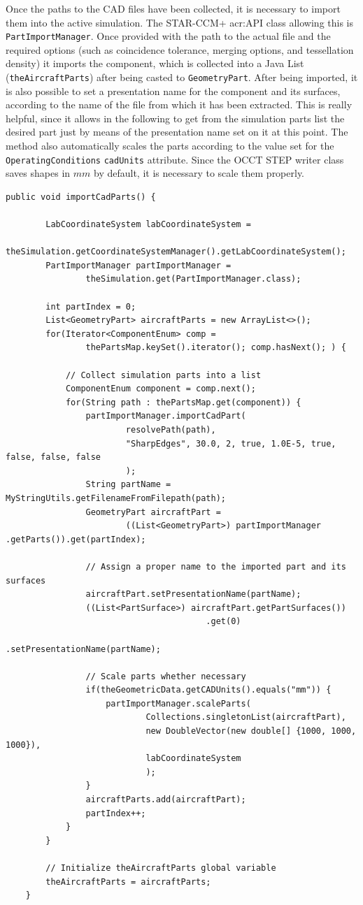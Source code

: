 Once the paths to the \gls{CAD} files have been collected, it is necessary to import them into the active simulation. The STAR-CCM+ \gls{acr:API} class allowing this is \lstinline[language=Java]!PartImportManager!. Once provided with the path to the actual file and the required options (such as coincidence tolerance, merging options, and tessellation density) it imports the component, which is collected into a Java \gls{List} (\lstinline[language=Java]!theAircraftParts!) after being casted to \lstinline[language=Java]!GeometryPart!. After being imported, it is also possible to set a presentation name for the component and its surfaces, according to the name of the file from which it has been extracted. This is really helpful, since it allows in the following to get from the simulation parts list the desired part just by means of the presentation name set on it at this point. The method also automatically scales the parts according to the value set for the \lstinline[language=Java]!OperatingConditions! \lstinline[language=Java]!cadUnits! attribute. Since the \gls{OCCT} STEP writer class saves shapes in $\si{mm}$ by default, it is necessary to scale them properly.
\bigskip
\begin{lstlisting}[caption={\lstinline!importCADParts! method}, captionpos=b, tabsize=2, label={lst:importCADParts}]
public void importCadParts() {

		LabCoordinateSystem labCoordinateSystem = 
				theSimulation.getCoordinateSystemManager().getLabCoordinateSystem();
		PartImportManager partImportManager = 
				theSimulation.get(PartImportManager.class);

		int partIndex = 0;
		List<GeometryPart> aircraftParts = new ArrayList<>();
		for(Iterator<ComponentEnum> comp = 
				thePartsMap.keySet().iterator(); comp.hasNext(); ) {
			
			// Collect simulation parts into a list	
			ComponentEnum component = comp.next();		
			for(String path : thePartsMap.get(component)) {
				partImportManager.importCadPart(
						resolvePath(path), 
						"SharpEdges", 30.0, 2, true, 1.0E-5, true, false, false, false
						);
				String partName = MyStringUtils.getFilenameFromFilepath(path);
				GeometryPart aircraftPart = 
						((List<GeometryPart>) partImportManager .getParts()).get(partIndex);
				
				// Assign a proper name to the imported part and its surfaces		
				aircraftPart.setPresentationName(partName);
				((List<PartSurface>) aircraftPart.getPartSurfaces())
										.get(0)
										.setPresentationName(partName);
				
				// Scale parts whether necessary
				if(theGeometricData.getCADUnits().equals("mm")) {
					partImportManager.scaleParts(
							Collections.singletonList(aircraftPart), 
							new DoubleVector(new double[] {1000, 1000, 1000}), 
							labCoordinateSystem
							);
				}
				aircraftParts.add(aircraftPart);
				partIndex++;
			}
		}			
		
		// Initialize theAircraftParts global variable
		theAircraftParts = aircraftParts;
	}
\end{lstlisting}

